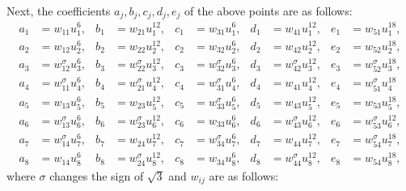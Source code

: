 \documentclass[11pt]{amsart}
\numberwithin{equation}{section}
\numberwithin{table}{section}
\newcommand\<{\langle}
\begin{document}
Next, the coefficients  $a_j, b_j, c_j, d_j, e_j$ of the above  points
are as follows: 	 
\begin{align*}
	a_1&=w_{11} u_1^6, & 	b_1&=w_{21}  u_1^{12},& c_1&=w_{31}  u_1^6,& 	d_1 &= w_{41} u_1^{12},& 	e_1&= w_{51} u_1^{18},\\
	a_2&=w_{12} u_2^6,&	b_2&=  w_{22}  u_2^{12}, & 	c_2&= w_{32} u_2^6,& 	d_2 &= w_{42} u_2^{12},& 	e_2&=w_{52} u_2^{18},\\
	a_3&=w_{12}^\sigma u_3^6, &b_3 &=  w_{22}^\sigma  u_3^{12},&c_3&= w_{32}^\sigma  u_3^6,&d_3 &= w_{42}^\sigma  u_3^{12},&
	e_3&= w_{52}^\sigma u_3^{18},\\ 
	a_4&=w_{11}^\sigma u_4^6,& b_4 &= w_{21}^\sigma u_4^{12},& c_4&=  w_{31}^\sigma u_4^6,& d_4 &= w_{41}  u_4^{12},&
	e_4&= w_{51}^\sigma u_4^{18}\\
	a_5&=  w_{13} u_5^6,&  b_5 &= w_{23} u_5^{12},& c_5&= w_{33}^\sigma u_5^6,& d_5 &= w_{43} u_5^{12},& e_5&= w_{53} u_5^{18},\\ 
	a_6&= w_{13}^\sigma  u_6^6,& b_6 &= w_{23}^\sigma  u_6^{12},& c_6&=  w_{33}  u_6^6,& d_6 &=w_{43}^\sigma u_6^{12},& e_6 &=w_{53}^\sigma u_6^{12},\\
	a_7&= w_{14}^\sigma u_7^6,& 	b_7 &=w_{24} u_7^{12},& c_7&= w_{34}^\sigma u_7^6,& d_7 &=  w_{44} u_7^{12},&e_7&= w_{54}^\sigma u_7^{18},\\
	a_8&=  w_{14} u_8^6& b_8 &=  w_{24}^\sigma u_8^{12},& c_8&=   w_{34} u_8^6,& d_8 &= w_{44}^\sigma u_8^{12},& e_8&= w_{54} 	u_8^{18},
\end{align*}
where $\sigma$   changes the sign of $\sqrt{3}$ and $w_{ij}$ are as follows:
\end{document}
